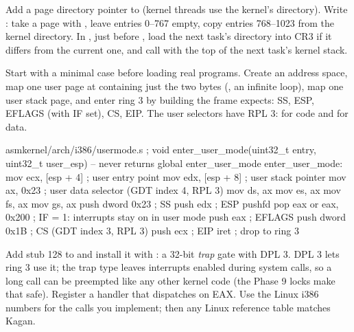 \documentclass[11pt,a4paper]{article}
\begin{document}
Add a page directory pointer to  (kernel threads use the kernel's directory). Write
: take a page with , leave entries 0--767 empty, copy entries
768--1023 from the kernel directory. In , just before , load the next task's
directory into CR3 if it differs from the current one, and call  with the top of the next
task's kernel stack.

Start with a minimal case before loading real programs. Create an address space, map one user page at 
containing just the two bytes  (, an infinite loop), map one user stack page, and enter ring 3
by building the frame  expects: SS, ESP, EFLAGS (with IF set), CS, EIP. The user selectors have RPL 3:
 for code and  for data.

\begin{lst}{asm}{kernel/arch/i386/usermode.s}
; void enter_user_mode(uint32_t entry, uint32_t user_esp)   -- never returns
global enter_user_mode
enter_user_mode:
    mov  ecx, [esp + 4]     ; user entry point
    mov  edx, [esp + 8]     ; user stack pointer
    mov  ax, 0x23           ; user data selector (GDT index 4, RPL 3)
    mov  ds, ax
    mov  es, ax
    mov  fs, ax
    mov  gs, ax
    push dword 0x23         ; SS
    push edx                ; ESP
    pushfd
    pop  eax
    or   eax, 0x200         ; IF = 1: interrupts stay on in user mode
    push eax                ; EFLAGS
    push dword 0x1B         ; CS (GDT index 3, RPL 3)
    push ecx                ; EIP
    iret                    ; drop to ring 3
\end{lst}

Add stub 128 to  and install it with : a 32-bit
\emph{trap} gate with DPL 3. DPL 3 lets ring 3 use it; the trap type leaves interrupts enabled during system calls,
so a long call can be preempted like any other kernel code (the Phase 9 locks make that safe). Register a handler
that dispatches on EAX. Use the Linux i386 numbers for the calls you implement; then any Linux reference table
matches Kagan.
\end{document}
